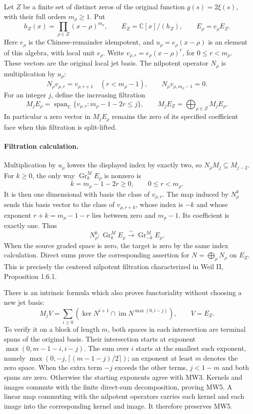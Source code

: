\documentclass[11pt,a4paper]{article}
\begin{document}
Let \(Z\) be a finite set of distinct zeros of the original function
\(g(s)=2\xi(s)\), with their full orders \(m_\rho\geq1\). Put
\[
 h_Z(x)=\prod_{\rho\in Z}(x-\rho)^{m_\rho},\qquad
 E_Z=\mathbb C[x]/(h_Z),\qquad
 E_\rho=e_\rho E_Z.
 \tag{MW1}
\]
Here \(e_\rho\) is the Chinese-remainder idempotent, and
\(u_\rho=e_\rho(x-\rho)\) is an element of this algebra, with local unit
\(e_\rho\). Write \(v_{\rho,r}=e_\rho(x-\rho)^r\), for
\(0\leq r<m_\rho\). These vectors are the original local jet basis.
The nilpotent operator \(N_\rho\) is multiplication by \(u_\rho\):
\[
 N_\rho v_{\rho,r}=v_{\rho,r+1}\quad(r<m_\rho-1),\qquad
 N_\rho v_{\rho,m_\rho-1}=0.
 \tag{MW2}
\]
For an integer \(j\), define the increasing filtration
\[
 M_jE_\rho
 =\operatorname{span}_{\mathbb C}
   \{v_{\rho,r}:m_\rho-1-2r\leq j\},\qquad
 M_jE_Z=\bigoplus_{\rho\in Z}M_jE_\rho .
 \tag{MW3}
\]
In particular a zero vector in \(M_jE_\rho\) remains the zero of its specified
coefficient face when this filtration is split-lifted.

\paragraph{Filtration calculation.}
Multiplication by \(u_\rho\) lowers the displayed index by exactly two,
so \(N_\rho M_j\subseteq M_{j-2}\). For \(k\geq0\), the only way
\(\operatorname{Gr}_k^M E_\rho\) is nonzero is
\[
 k=m_\rho-1-2r\geq0,\qquad 0\leq r<m_\rho .
\]
It is then one dimensional with basis the class of \(v_{\rho,r}\).
The map induced by \(N_\rho^k\) sends this basis vector to the class of
\(v_{\rho,r+k}\), whose index is \(-k\) and whose exponent
\(r+k=m_\rho-1-r\) lies between zero and \(m_\rho-1\).
Its coefficient is exactly one. Thus
\[
 N_\rho^k:\operatorname{Gr}_k^M E_\rho
       \xrightarrow{\;\sim\;}\operatorname{Gr}_{-k}^M E_\rho .
 \tag{MW4}
\]
When the source graded space is zero, the target is zero by the same
index calculation. Direct sums prove the corresponding assertion for
\(N=\bigoplus_\rho N_\rho\) on \(E_Z\).
This is precisely the centered nilpotent filtration characterized in
Weil II, Proposition 1.6.1.

There is an intrinsic formula which also proves functoriality without
choosing a new jet basis:
\[
 M_jV=\sum_{i\geq0}
       \left(\ker N^{i+1}\cap
                    \operatorname{im}N^{\max(0,i-j)}\right),
 \qquad V=E_Z .
 \tag{MW5}
\]
To verify it on a block of length \(m\), both spaces in each intersection
are terminal spans of the original basis. Their intersection starts at
exponent \(\max(0,m-1-i,i-j)\). The sum over \(i\) starts at the smallest
such exponent, namely
\(\max(0,-j,\lceil(m-1-j)/2\rceil)\); an exponent at least \(m\) denotes the
zero space. When the extra term \(-j\) exceeds the other terms,
\(j<1-m\) and both spans are zero. Otherwise the starting exponents
agree with MW3. Kernels and images commute with the
finite direct-sum decomposition, proving MW5. A linear map commuting
with the nilpotent operators carries each kernel and each image into
the corresponding kernel and image. It therefore preserves MW5.
\end{document}

